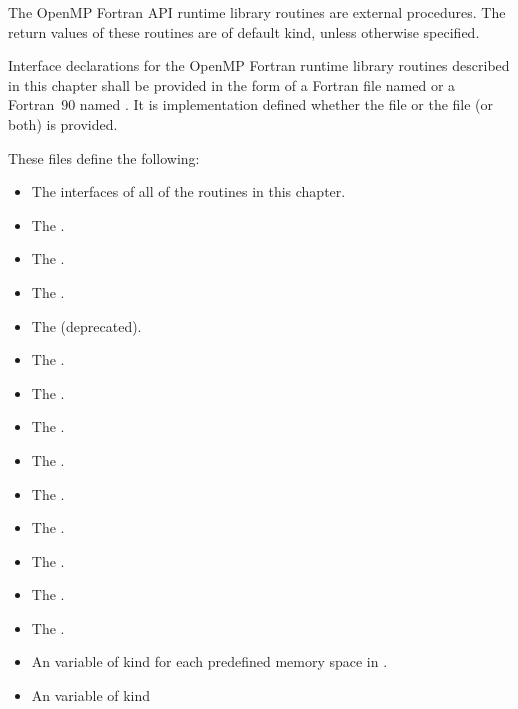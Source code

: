 \begin{fortranspecific}
The OpenMP Fortran API runtime library routines are external procedures. The 
return values of these routines are of default kind, unless otherwise specified.

Interface declarations for the OpenMP Fortran runtime library routines 
described in this chapter shall be provided in the form of a Fortran 
 file named  or a Fortran~90  
named . It is implementation defined whether the
 file or the  file (or both) is provided.

These files define the following:

\begin{itemize}
\item The interfaces of all of the routines in this chapter.
\item The   .
\item The   .
\item The   .
\item The    (deprecated).
\item The   .
\item The   .
\item The   .
\item The   .
\item The   .
\item The   .
\item The   .
\item The   .
\item The   .
\item An   variable of kind 
       for each predefined memory space 
      in .
\item An   variable of kind 

\end{itemize}
\end{fortranspecific}
